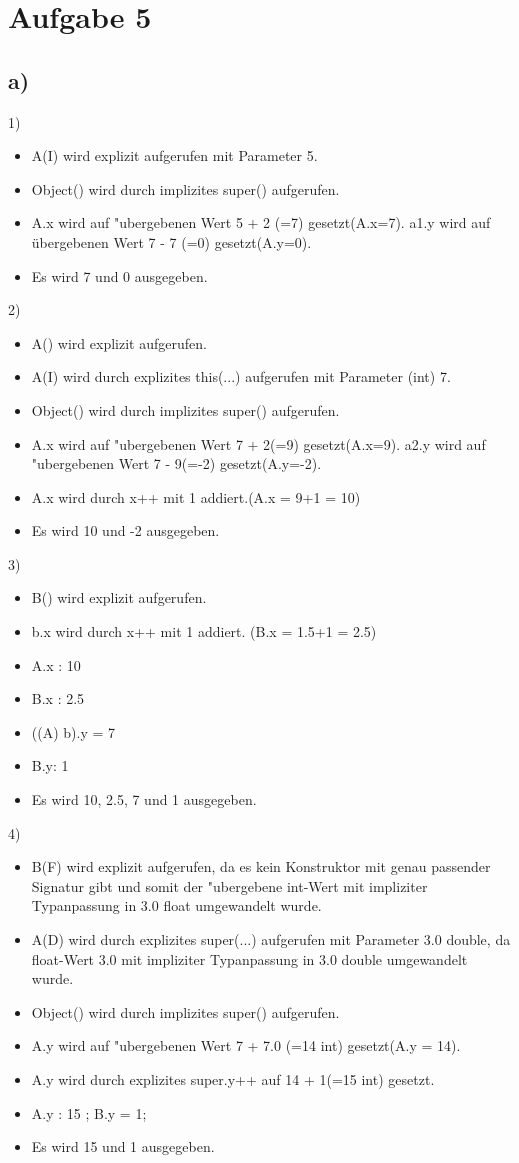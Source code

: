 \documentclass[a4paper,11pt]{scrartcl}
\begin{document}
\section*{Aufgabe 5}
\subsection*{a)}
	1)
	\begin{itemize}
		\item A(I) wird explizit aufgerufen mit Parameter 5.
		\item Object() wird durch implizites super() aufgerufen.
		\item A.x wird auf "ubergebenen Wert 5 + 2 (=7) gesetzt(A.x=7). a1.y wird auf übergebenen Wert 7 - 7 (=0) gesetzt(A.y=0).
		\item Es wird 7 und 0 ausgegeben.
	\end{itemize}
	2)
	\begin{itemize}
		\item A() wird explizit aufgerufen.
		\item A(I) wird durch explizites this(...) aufgerufen mit Parameter (int) 7.
		\item Object() wird durch implizites super() aufgerufen.
		\item A.x wird auf "ubergebenen Wert 7 + 2(=9) gesetzt(A.x=9). a2.y wird auf "ubergebenen Wert 7 - 9(=-2) gesetzt(A.y=-2).
		\item A.x wird durch x++ mit 1 addiert.(A.x = 9+1 = 10)
		\item Es wird 10 und -2 ausgegeben.
	\end{itemize}
	3)
	\begin{itemize}
		\item B() wird explizit aufgerufen.
		\item b.x wird durch x++ mit 1 addiert. (B.x = 1.5+1 = 2.5)
		\item A.x : 10
		\item B.x : 2.5
		\item ((A) b).y = 7
		\item B.y: 1
		\item Es wird 10, 2.5, 7 und 1 ausgegeben.
	\end{itemize}
	4)
	\begin{itemize}
		\item B(F) wird explizit aufgerufen, da es kein Konstruktor mit genau passender Signatur gibt und somit der "ubergebene int-Wert mit impliziter Typanpassung in 3.0 float umgewandelt wurde.
		\item A(D) wird durch explizites super(...) aufgerufen mit Parameter 3.0 double, da float-Wert 3.0 mit impliziter Typanpassung in 3.0 double umgewandelt wurde.
		\item Object() wird durch implizites super() aufgerufen.  
		\item A.y wird auf "ubergebenen Wert 7 + 7.0 (=14 int) gesetzt(A.y = 14).
		\item A.y wird durch explizites super.y++ auf 14 + 1(=15 int) gesetzt.
		\item A.y : 15 ; B.y = 1;
		\item Es wird 15 und 1 ausgegeben.
	\end{itemize}
\end{document}
